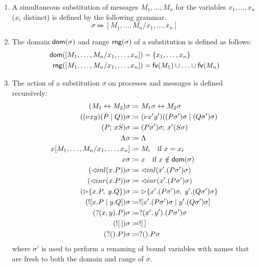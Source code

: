 \begin{definition}[Substitution] \label{def:pi-fd:substitution}
  \begin{enumerate}
  \item A simultaneous substitution of messages $M_1, \hdots, M_n$ for
  the variables $x_1, \hdots, x_n$ ($x_i$ distinct) is defined by the
  following grammar.
  \[
    \sigma \Coloneqq [M_1, \hdots, M_n/x_1, \hdots, x_n]
  \]
  \item The domain $\mathsf{dom}(\sigma)$ and range $\mathsf{rng}(\sigma)$ of a substitution
  is defined as follows:
  \begin{align*}
    \mathsf{dom}([M_1, \hdots, M_n/x_1, \hdots, x_n]) &= \{x_1, \hdots, x_n\} \\
    \mathsf{rng}([M_1, \hdots, M_n/x_1, \hdots, x_n]) &= \mathsf{fv}(M_1) \cup \hdots \cup \mathsf{fv}(M_n)
  \end{align*}
  \item The action of a substitution $\sigma$ on processes and messages is defined
  recursively:
  {\allowdisplaybreaks
  \begin{align*}
    (M_1 \leftrightarrow M_2)\sigma &\coloneq M_1\sigma \leftrightarrow M_2\sigma \\
    ((\nu x y)(P \mid Q))\sigma &\coloneq (\nu x' y')((P\sigma')\sigma \mid (Q\sigma')\sigma) \\
    (P ;\, xS)\sigma &\coloneq (P \sigma')\sigma ;\, x'(S\sigma) \\
    \Lambda\sigma &\coloneq \Lambda \\
    x[M_1, \hdots, M_n/x_1, \hdots, x_n] &\coloneq M_i \quad \text{if } x = x_i \\
    x\sigma &\coloneq x \quad \text{if } x \notin \mathsf{dom}(\sigma) \\
    (\lhd inl(x.P))\sigma &\coloneq \lhd inl(x'.(P\sigma')\sigma) \\
    (\lhd inr(x.P))\sigma &\coloneq \lhd inr(x'.(P\sigma')\sigma) \\
    (\rhd \{ x.P,\; y.Q \})\sigma &\coloneq \rhd \{ x'.(P\sigma')\sigma,\; y'.(Q\sigma')\sigma \} \\
    (! [x.P \mid y.Q])\sigma &\coloneq ! [x'.(P\sigma')\sigma \mid y'.(Q\sigma')\sigma] \\
    (? (x, y).P)\sigma &\coloneq ? (x', y').(P\sigma')\sigma \\
    (! [\,])\sigma &\coloneq ! [\,] \\
    (? ().P)\sigma &\coloneq ? ().P\sigma
  \end{align*}
  where $\sigma'$ is used to perform a renaming of bound variables with names
  that are fresh to both the domain and range of $\sigma$.
  }
  \end{enumerate}
\end{definition}

